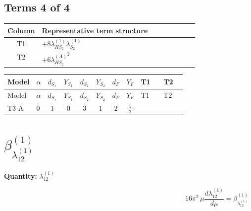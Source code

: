 \documentclass[8pt]{article}
\begin{document}
\begin{landscape}
\subsection*{Terms 4 of 4}
\begin{center}
\begin{tabular}{@{}c >{\raggedright\arraybackslash}p{0.82\linewidth}@{}}
\toprule
Column & Representative term structure \\
\midrule
T1 & \(\displaystyle +8 {\lambda_{HS_2}^{(1)}} {\lambda_{S_2}^{(1)}}\) \\
\midrule
T2 & \(\displaystyle +6 {\lambda_{HS_2}^{(A)}}^2\) \\
\midrule
\bottomrule
\end{tabular}
\end{center}
\smallskip
\tiny
\begin{longtable}{@{}llcccccc >{\raggedright\arraybackslash}p{0.21\linewidth} >{\raggedright\arraybackslash}p{0.21\linewidth}@{}}
\toprule
Model & $\alpha$ & $d_{S_1}$ & $Y_{S_1}$ & $d_{S_2}$ & $Y_{S_2}$ & $d_F$ & $Y_F$ & T1 & T2 \\
\midrule
\endfirsthead
\toprule
Model & $\alpha$ & $d_{S_1}$ & $Y_{S_1}$ & $d_{S_2}$ & $Y_{S_2}$ & $d_F$ & $Y_F$ & T1 & T2 \\
\midrule
\endhead
T3-A & $0$ & $1$ & $0$ & $3$ & $1$ & $2$ & $\frac{1}{2}$ & \scriptsize\adjustbox{max width=\linewidth}{$\begin{gathered} +8 {\lambda_{HS_2}^{(1)}} {\lambda_{S_2}^{(1)}}\end{gathered}$} & \scriptsize\adjustbox{max width=\linewidth}{$\begin{gathered} +6 {\lambda_{HS_2}^{(A)}}^2\end{gathered}$} \\
\midrule
\bottomrule
\end{longtable}
\clearpage
\section*{$\beta_{\lambda_{12}^{(1)}}^{(1)}$}
\noindent\textbf{Quantity: }$\lambda_{12}^{(1)}$\par\smallskip
\[16\pi^2\,\mu\frac{d \lambda_{12}^{(1)}}{d\mu}=\beta_{\lambda_{12}^{(1)}}^{(1)}\]

\end{landscape}
\end{document}
